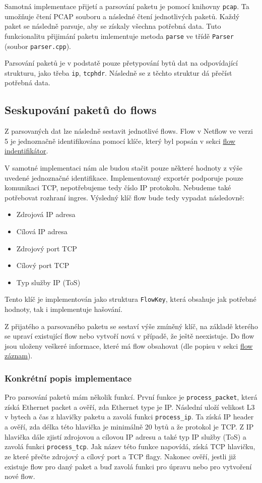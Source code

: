 \documentclass{article}
\begin{document}
Samotná implementace přijetí a parsování paketu je pomocí knihovny
\texttt{pcap}. Ta umožňuje čtení PCAP souboru a následné čtení jednotlivých
paketů. Každý paket se následně parsuje, aby se získaly všechna potřebná data.
Tuto funkcionalitu přijimání paketu imlementuje metoda \texttt{parse} ve třídě
\texttt{Parser} (soubor \texttt{parser.cpp}).

Parsování paketů je v podstatě pouze přetypování bytů dat na odpovídající
strukturu, jako třeba \texttt{ip}, \texttt{tcphdr}. Následně se z těchto
struktur dá přečíst potřebná data.

\subsection{Seskupování paketů do flows}

Z parsovaných dat lze následně sestavit jednotlivé flows. Flow v Netflow ve
verzi 5 je jednoznačně identifikována pomocí klíče, který byl popsán v sekci
\hyperref[sec:flow-key]{flow indentifikátor}.

V samotné implementaci nám ale budou stačit pouze některé hodnoty z výše
uvedené jednoznačné identifikace. Implementovaný exportér podporuje pouze
komunikaci TCP, nepotřebujeme tedy číslo IP protokolu. Nebudeme také \\
potřebovat rozhraní ingres. Výsledný klíč flow bude tedy vypadat následovně:
\begin{itemize}
    \item Zdrojová IP adresa
    \item Cílová IP adresa
    \item Zdrojový port TCP
    \item Cílový port TCP
    \item Typ služby IP (ToS)
\end{itemize}

Tento klíč je implementován jako struktura \texttt{FlowKey}, která obsahuje jak
potřebné hodnoty, tak i implementuje hašování.

Z přijatého a parsovaného paketu se sestaví výše zmíněný klíč, na základě
kterého se upraví existující flow nebo vytvoří nová v případě, že ještě
neexistuje. Do flow jsou uloženy veškeré informace, které má flow obsahovat
(dle popisu v sekci \hyperref[sec:flow-record]{flow záznam}).

\subsubsection{Konkrétní popis implementace}
Pro parsování paketů mám několik funkcí. První funkce je
\texttt{process\_packet}, která získá Ethernet packet a ověří, zda Ethernet
type je IP. Následní uloží velikost L3 v bytech a čas z hlavičky paketu a
zavolá funkci \texttt{process\_ip}. Ta získá IP header a ověří, zda
délka této hlavička je minimálně 20 bytů a že protokol je TCP. Z IP hlavička
dále zjistí zdrojovou a cílovou IP adresu a také typ IP služby (ToS) a zavolá
funkci \texttt{process\_tcp}. Jak název této funkce napovídá, získá TCP
hlavičku, ze které přečte zdrojový a cílový port a TCP flagy. Nakonec ověří,
jestli již existuje flow pro daný paket a buď zavolá funkci pro úpravu nebo
pro vytvoření nové flow.
\end{document}
